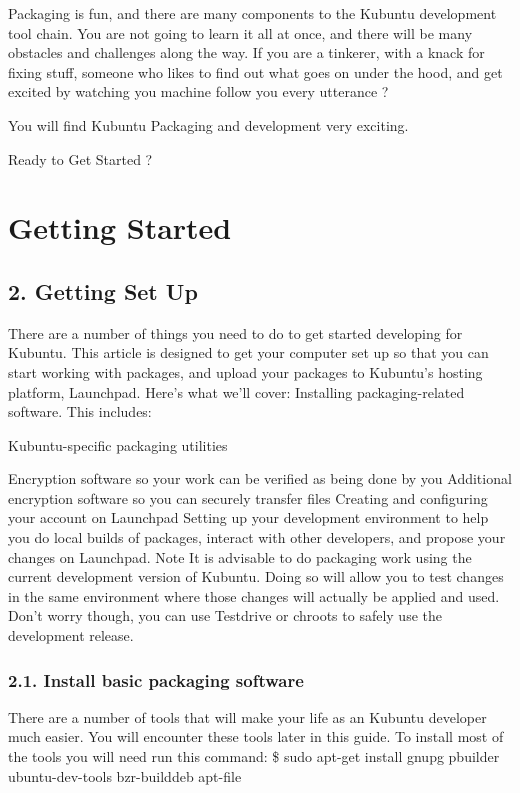 \documentclass[letterpaper,10pt,english]{sphinxmanual}
\begin{document}
Packaging is fun, and there are many components to the Kubuntu development tool chain. You are not going to learn it all at once, and there will be many obstacles and challenges along the way.
If you are a tinkerer, with a knack for fixing stuff, someone who likes to find out what goes on under the hood, and get excited by watching you machine follow you every utterance ?

You will find Kubuntu Packaging and development very exciting.

Ready to Get Started ?


\section{Getting Started}
\label{docs/packaging_guide/getting_started:getting-started}\label{docs/packaging_guide/getting_started::doc}

\subsection{2. Getting Set Up}
\label{docs/packaging_guide/getting_started:getting-set-up}
There are a number of things you need to do to get started developing for Kubuntu. This article is designed to get your computer set up so that you can start working with packages, and upload your packages to Kubuntu’s hosting platform, Launchpad. Here’s what we’ll cover:
Installing packaging-related software. This includes:

Kubuntu-specific packaging utilities

Encryption software so your work can be verified as being done by you
Additional encryption software so you can securely transfer files
Creating and configuring your account on Launchpad
Setting up your development environment to help you do local builds of packages, interact with other developers, and propose your changes on Launchpad.
Note
It is advisable to do packaging work using the current development version of Kubuntu. Doing so will allow you to test changes in the same environment where those changes will actually be applied and used.
Don’t worry though, you can use Testdrive or chroots to safely use the development release.


\subsubsection{2.1. Install basic packaging software}
\label{docs/packaging_guide/getting_started:install-basic-packaging-software}
There are a number of tools that will make your life as an Kubuntu developer much easier. You will encounter these tools later in this guide. To install most of the tools you will need run this command:
\$ sudo apt-get install gnupg pbuilder ubuntu-dev-tools bzr-builddeb apt-file
\end{document}
